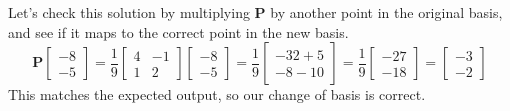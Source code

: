\documentclass{article}
\begin{document}
                \begin{solutioncheck}
                    Let's check this solution by multiplying $\mathbf{P}$ by another point
                    in the original basis, and see if it maps to the correct point in the new basis.
                    \[
                        \mathbf{P}\begin{bmatrix}-8\\-5\end{bmatrix}
                        =
                        \frac{1}{9}
                        \begin{bmatrix}4 & -1\\1 & 2\end{bmatrix}
                        \begin{bmatrix}-8\\-5\end{bmatrix}
                        =
                        \frac{1}{9}
                        \begin{bmatrix}-32 + 5\\-8 - 10\end{bmatrix}
                        =
                        \frac{1}{9}
                        \begin{bmatrix}-27\\-18\end{bmatrix}
                        =
                        \begin{bmatrix}-3\\-2\end{bmatrix}
                    \]
                    This matches the expected output, so our change of basis is correct.
                \end{solutioncheck}
\end{document}
